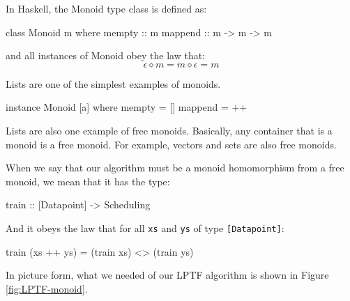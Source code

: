 \documentclass[tikz]{tmr}
\newcommand\+{\mdoubleplus}
\begin{document}
In Haskell, the Monoid type class is defined as:
\begin{spec}
class Monoid m where
    mempty  :: m
    mappend :: m -> m -> m
\end{spec}
and all instances of Monoid obey the law that:
$$
\epsilon \diamond m = m\diamond \epsilon = m
$$

Lists are one of the simplest examples of monoids.

\begin{spec}
instance Monoid [a] where
    mempty = []
    mappend = ++
\end{spec}

Lists are also one example of free monoids.
Basically, any container that is a monoid is a free monoid.
For example, vectors and sets are also free monoids.

When we say that our algorithm must be a monoid homomorphism from a free monoid, we mean that it has the type:
\begin{spec}
train :: [Datapoint] -> Scheduling
\end{spec}
And it obeys the law that for all \lstinline{xs} and \lstinline{ys} of type \lstinline{[Datapoint]}:
\begin{spec}
train (xs ++ ys) = (train xs) <> (train ys)
\end{spec}

In picture form, what we needed of our LPTF algorithm is shown in Figure \ref{fig:LPTF-monoid}.
\end{document}
